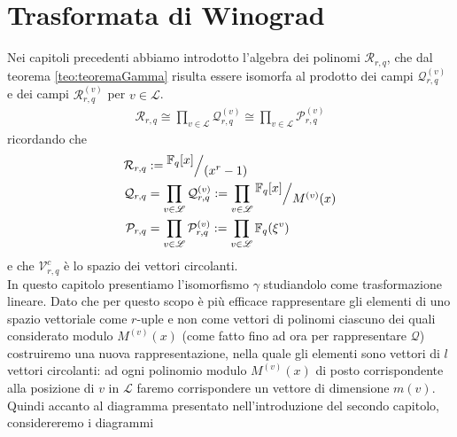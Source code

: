 
\chapter{Trasformata di Winograd} \label{cap:trasformataWinograd}
Nei capitoli precedenti abbiamo introdotto l'algebra dei polinomi $\mathcal{R}_{r,q}$, che dal teorema \ref{teo:teoremaGamma} risulta essere isomorfa al prodotto dei campi $\mathcal{Q}_{r,q}^{(v)}$ e dei campi $\mathcal{R}_{r,q}^{(v)}$ per $v\in \mathscr{L}$.
\begin{align*}
   \mathcal{R}_{r,q}
  \cong
  \prod_{v\in \mathscr{L}} \mathcal{Q}_{r,q}^{(v)}
  \cong
  \prod_{v\in \mathscr{L}} \mathcal{P}_{r,q}^{(v)}
\end{align*}
ricordando che
\begin{align*}
  \mathcal{R}_{r,q}
  &:=
  \quotient{ \mathbb{F}_{q}[x] }{ (x^r -1 )} 
\\  
  \mathcal{Q}_{r,q} 
  &=  \prod_{v \in \mathscr{L}} \mathcal{Q}_{r,q}^{(v)}
  := \prod_{v \in \mathscr{L}} \quotient{ \mathbb{F}_{q}[x] }{ M^{(v)}(x)} 
\\  
  \mathcal{P}_{r,q} 
  &=  \prod_{v \in \mathscr{L}} \mathcal{P}_{r,q}^{(v)}
  := \prod_{v \in \mathscr{L}}  \mathbb{F}_{q}(\xi^{v})  
\end{align*}
e che $ \mathcal{V}_{r, q}^{c}$ è lo spazio dei vettori circolanti.\\
In questo capitolo presentiamo l'isomorfismo $\gamma$ studiandolo come trasformazione lineare. 
Dato che per questo scopo è più efficace rappresentare gli elementi di uno spazio vettoriale come $r$-uple e non come vettori di polinomi ciascuno dei quali considerato modulo $M^{(v)}(x)$ (come fatto fino ad ora per rappresentare $\mathcal{Q}$) costruiremo una nuova rappresentazione, nella quale gli elementi sono vettori di $l$ vettori circolanti: ad ogni polinomio modulo $M^{(v)}(x)$ di posto corrispondente alla posizione di $v$ in $\mathscr{L}$ faremo corrispondere un vettore di dimensione $m(v)$.\\
Quindi accanto al diagramma presentato nell'introduzione del secondo capitolo, considereremo i diagrammi

